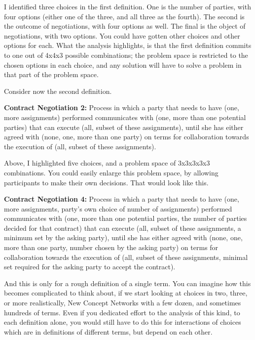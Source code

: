\documentclass[graybox,envcountchap,sectrefs]{svmono}
\newcommand{\ncnf}{New Concept Network}
\begin{document}
I identified three choices in the first definition. One is the number of parties, with four options (either one of the three, and all three as the fourth). The second is the outcome of negotiations, with four options as well. The final is the object of negotiations, with two options. You could have gotten other choices and other options for each. What the analysis highlights, is that the first definition commits to one out of 4x4x3 possible combinations; the problem space is restricted to the chosen options in each choice, and any solution will have to solve a problem in that part of the problem space.

Consider now the second definition.

\begin{svgraybox}
\textbf{Contract Negotiation 2:} Process in which a party that needs to have (one, more assignments) performed communicates with (one, more than one potential parties) that can execute (all, subset of these assignments), until she has either agreed with (none, one, more than one party) on terms for collaboration towards the execution of (all, subset of these assignments).
\end{svgraybox}

Above, I highlighted five choices, and a problem space of 3x3x3x3x3 combinations. You could easily enlarge this problem space, by allowing participants to make their own decisions. That would look like this.

\begin{svgraybox}
\textbf{Contract Negotiation 4:} Process in which a party that needs to have (one, more assignments, party's own choice of number of assignments) performed communicates with (one, more than one potential parties, the number of parties decided for that contract) that can execute (all, subset of these assignments, a minimum set by the asking party), until she has either agreed with (none, one, more than one party, number chosen by the asking party) on terms for collaboration towards the execution of (all, subset of these assignments, minimal set required for the asking party to accept the contract).
\end{svgraybox}

And this is only for a rough definition of a single term. You can imagine how this becomes complicated to think about, if we start looking at choices in two, three, or more realistically, \ncnf{}s with a few dozen, and sometimes hundreds of terms. Even if you dedicated effort to the analysis of this kind, to each definition alone, you would still have to do this for interactions of choices which are in definitions of different terms, but depend on each other.
\end{document}
